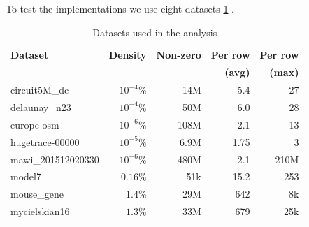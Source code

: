 \documentclass[conference]{IEEEtran}
\begin{document}
To test the implementations we use eight datasets \ref{tab:dataset} .
\begin{table}[h!]
	\centering
	\begin{adjustbox}{width=1\columnwidth}
		\begin{tabular}{lrrrr}
			\toprule
			\textbf{Dataset} & \textbf{Density} & \textbf{Non-zero} & \textbf{Per row} & \textbf{Per row} \\
			&  \textbf{ } &  & \textbf{ (avg)} & \textbf{ (max)} \\
			\midrule
			circuit5M\_dc & $10^{-4}\%$ & 14M & 5.4 & 27 \\
			delaunay\_n23 & $10^{-4}\%$ & 50M & 6.0 & 28\\
			europe osm & $10^{-6}\%$ & 108M & 2.1 & 13\\
			hugetrace-00000 & $10^{-5}\%$ & 6.9M & 1.75 & 3\\
			mawi\_201512020330 & $10^{-6}\%$ & 480M & 2.1 & 210M \\
			model7  & $0.16\%$ & 51k & 15.2 & 253\\
			mouse\_gene & $1.4\%$ & 29M & 642 & 8k\\
			mycielskian16 & $1.3\%$ & 33M & 679 & 25k \\
			\bottomrule
		\end{tabular}
	\end{adjustbox}
	\vspace{1em}

	\caption{Datasets used in the analysis}
	\label{tab:dataset}
\end{table}
\end{document}
